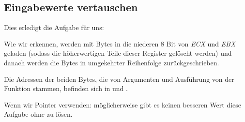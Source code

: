 \subsection{Eingabewerte vertauschen}

Dies erledigt die Aufgabe für uns:


Wie wir erkennen, werden mit  Bytes in die niederen 8 Bit von \emph{ECX} und \emph{EBX} geladen (sodass die
höherwertigen Teile dieser Register gelöscht werden) und danach werden die Bytes in umgekehrter Reihenfolge
zurückgeschrieben.


Die Adressen der beiden Bytes, die von Argumenten und Ausführung von der Funktion stammen, befinden sich in  und
. 

Wenn wir Pointer verwenden: möglicherweise gibt es keinen besseren Wert diese Aufgabe ohne zu lösen.